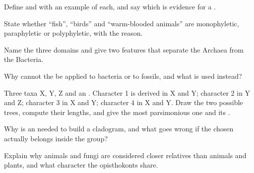 \begin{exercise}[$\star$]\label{exo:b1:classifying-biodiversity:2}
Define  and  with an example of each, and say which
is evidence for a .
\end{exercise}

\begin{exercise}[$\star$]\label{exo:b1:classifying-biodiversity:3}
State whether ``fish'', ``birds'' and ``warm-blooded animals'' are
monophyletic, paraphyletic or polyphyletic, with the reason.
\end{exercise}

\begin{exercise}[$\star$]\label{exo:b1:classifying-biodiversity:4}
Name the three domains and give two features that separate the
Archaea from the Bacteria.
\end{exercise}

\begin{exercise}[$\star\star$]\label{exo:b1:classifying-biodiversity:5}
Why cannot the  be applied to bacteria or
to fossils, and what is used instead?
\end{exercise}

\begin{exercise}[$\star\star$]\label{exo:b1:classifying-biodiversity:6}
Three taxa X, Y, Z and an . Character 1 is derived in X and Y;
character 2 in Y and Z; character 3 in X and Y; character 4 in X and
Y. Draw the two possible trees, compute their lengths, and give the
most parsimonious one and its .
\end{exercise}

\begin{exercise}[$\star\star$]\label{exo:b1:classifying-biodiversity:7}
Why is an  needed to build a cladogram, and what goes wrong
if the  chosen actually belongs inside the group?
\end{exercise}

\begin{exercise}[$\star\star$]\label{exo:b1:classifying-biodiversity:8}
Explain why animals and fungi are considered closer relatives than
animals and plants, and what character the opisthokonts share.
\end{exercise}

